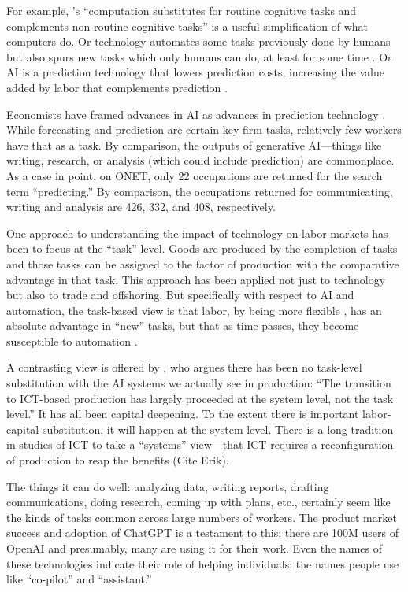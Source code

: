 \documentclass{article}
\begin{document}
For example, \cite{autor2003skill}'s ``computation substitutes for routine cognitive tasks and complements non-routine cognitive tasks'' is a useful simplification of what computers do. 
Or technology automates some tasks previously done by humans but also spurs new tasks which only humans can do, at least for some time \citep{acemoglu2019}. 
Or AI is a prediction technology that lowers prediction costs, increasing the value added by labor that complements prediction \citep{agrawal2019}. 

Economists have framed advances in AI as advances in prediction technology \citep{agrawal2019}.
While forecasting and prediction are certain key firm tasks, relatively few workers have that as a task. 
By comparison, the outputs of generative AI---things like writing, research, or analysis (which could include prediction) are commonplace. 
As a case in point, on ONET, only 22 occupations are returned for the search term ``predicting.'' 
By comparison, the occupations returned for communicating, writing and analysis are 426, 332, and 408, respectively. 

One approach to understanding the impact of technology on labor markets has been to focus at the ``task'' level.
Goods are produced by the completion of tasks and those tasks can be assigned to the factor of production with the comparative advantage in that task.
This approach has been applied not just to technology but also to trade and offshoring.
But specifically with respect to AI and automation, the task-based view is that labor, by being more flexible \citep{acemoglu2011skills}, has an absolute advantage in ``new'' tasks, but that as time passes, they become susceptible to automation \citep{acemoglu2018}.


A contrasting view is offered by \cite{bresnahan2020artificial}, who argues there has been no task-level substitution with the AI systems we actually see in production: ``The transition to ICT-based production has largely proceeded at the system level, not the task level.''
It has all been capital deepening.
To the extent there is important labor-capital substitution, it will happen at the system level.
There is a long tradition in studies of ICT to take a ``systems'' view---that ICT requires a reconfiguration of production to reap the benefits (Cite Erik).

The things it can do well: analyzing data, writing reports, drafting communications, doing research, coming up with plans, etc., certainly seem like the kinds of tasks common across large numbers of workers.
The product market success and adoption of ChatGPT is a testament to this: there are 100M users of OpenAI and presumably, many are using it for their work.
Even the names of these technologies indicate their role of helping individuals: the names people use like ``co-pilot'' and ``assistant.'' 
\end{document}
